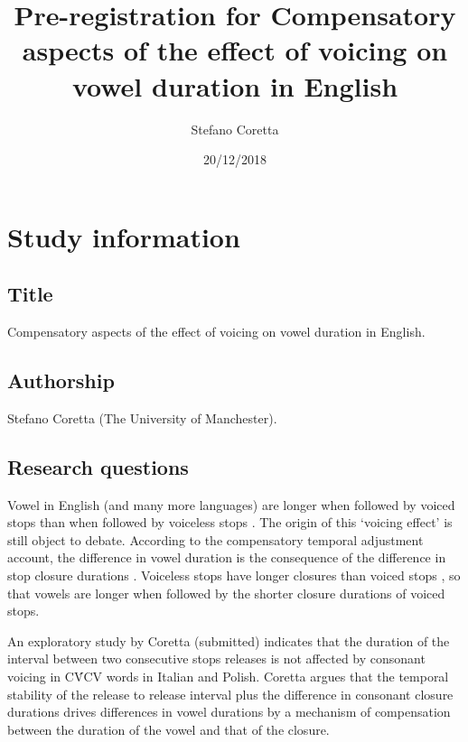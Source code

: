 \documentclass[11pt,]{article}
\title{Pre-registration for Compensatory aspects of the effect of voicing on
vowel duration in English}
\author{Stefano Coretta}
\date{20/12/2018}
\begin{document}
\maketitle

\hypertarget{study-information}{%
\section{Study information}\label{study-information}}

\hypertarget{title}{%
\subsection{Title}\label{title}}

Compensatory aspects of the effect of voicing on vowel duration in
English.

\hypertarget{authorship}{%
\subsection{Authorship}\label{authorship}}

Stefano Coretta (The University of Manchester).

\hypertarget{research-questions}{%
\subsection{Research questions}\label{research-questions}}

Vowel in English (and many more languages) are longer when followed by
voiced stops than when followed by voiceless stops \citep{heffner1937}.
The origin of this `voicing effect' is still object to debate. According
to the compensatory temporal adjustment account, the difference in vowel
duration is the consequence of the difference in stop closure durations
\citep{lindblom1967, slis1969a, slis1969, lehiste1970, lehiste1970a}.
Voiceless stops have longer closures than voiced stops
\citep{lisker1957, van-summers1987, davis1989, de-jong1991}, so that
vowels are longer when followed by the shorter closure durations of
voiced stops.

An exploratory study by Coretta (submitted) indicates that the duration
of the interval between two consecutive stops releases is not affected
by consonant voicing in CV́CV words in Italian and Polish. Coretta argues
that the temporal stability of the release to release interval plus the
difference in consonant closure durations drives differences in vowel
durations by a mechanism of compensation between the duration of the
vowel and that of the closure.
\end{document}
